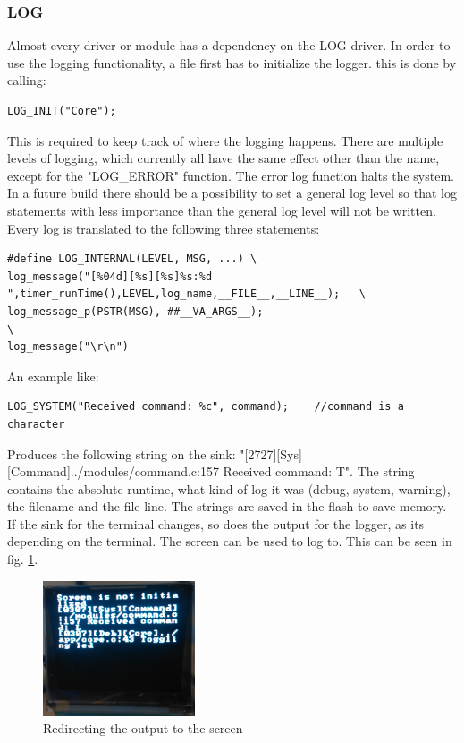 \subsubsection{LOG}
Almost every driver or module has a dependency on the LOG driver. In order to use the logging functionality, a file first has to initialize the logger. this is done by calling:
\begin{verbatim}
LOG_INIT("Core");
\end{verbatim}
This is required to keep track of where the logging happens. There are multiple levels of logging, which currently all have the same effect other than the name, except for the "LOG\_ERROR" function. The error log function halts the system. In a future build there should be a possibility to set a general log level so that log statements with less importance than the general log level will not be written. Every log is translated to the following three statements:
\begin{verbatim}
#define LOG_INTERNAL(LEVEL, MSG, ...) \
log_message("[%04d][%s][%s]%s:%d ",timer_runTime(),LEVEL,log_name,__FILE__,__LINE__);   \
log_message_p(PSTR(MSG), ##__VA_ARGS__);                                                        \
log_message("\r\n")
\end{verbatim}
An example like:
\begin{verbatim}
LOG_SYSTEM("Received command: %c", command);	//command is a character
\end{verbatim}
Produces the following string on the sink: "[2727][Sys][Command]../modules/command.c:157 Received command: T". The string contains the absolute runtime, what kind of log it was (debug, system, warning), the filename and the file line. The strings are saved in the flash to save memory. If the sink for the terminal changes, so does the output for the logger, as its depending on the terminal. The screen can be used to log to. This can be seen in fig. \ref{fig:screen_logger}.
\begin{figure}[H]
	\centering
	\label{fig:screen_logger}
	\includegraphics[width=0.4\textwidth]{./fig/screen_logger.png}
	\caption{Redirecting the output to the screen}
\end{figure}
